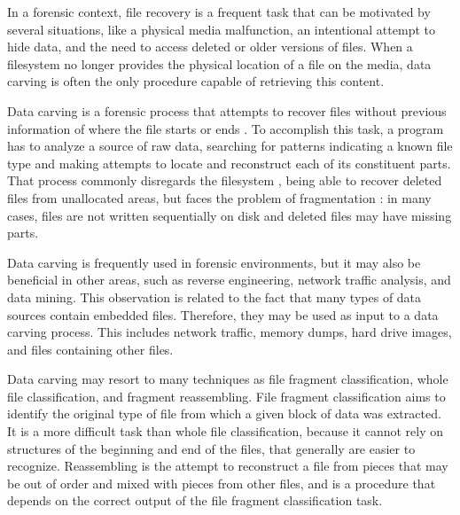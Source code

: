 In a forensic context, file recovery is a frequent task that can be motivated by several situations, like a physical media malfunction, an intentional attempt to hide data, and the need to access deleted or older versions of files. When a filesystem no longer provides the physical location of a file on the media, data carving is often the only procedure capable of retrieving this content.

Data carving is a forensic process that attempts to recover files without previous information of where the file starts or ends \cite{garfinkel_carving_2007}.
To accomplish this task, a program has to analyze a source of raw data, searching for patterns indicating a known file type and making attempts to locate and reconstruct each of its constituent parts.
That process commonly disregards the filesystem \cite{veenman_statistical_2007}, being able to recover deleted files from unallocated areas, but faces the problem of fragmentation \cite{veenman_statistical_2007}  \cite{pal_evolution_2009}: in many cases, files are not written sequentially on disk and deleted files may have missing parts.

Data carving is frequently used in forensic environments, but it may also be beneficial in other areas, such as reverse engineering, network traffic analysis, and data mining.
This observation is related to the fact that many types of data sources contain embedded files. Therefore, they may be used as input to a data carving process. This includes network traffic, memory dumps, hard drive images, and files containing other files.

Data carving may resort to many techniques as file fragment classification, whole file classification, and fragment reassembling.
File fragment classification aims to identify the original type of file from which a given block of
data was extracted. It is a more difficult task than whole file classification, because it cannot rely on structures of the beginning and end of the files, that generally are easier to recognize. Reassembling is the attempt to reconstruct a file from pieces that may be out of order and mixed with pieces from other files, and is a procedure that depends on the correct output of the file fragment classification task.